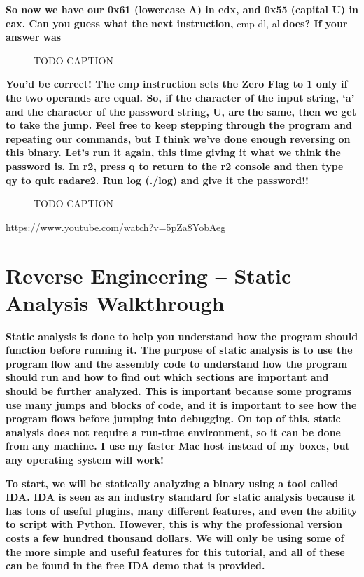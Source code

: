 \documentclass[letterpaper]{article}
\newcommand{\sitfig}[3]{
\begin{figure}[H]
\centering
\makebox[\textwidth][c]{
#2
}
\caption{#3}
\label{#1}
\end{figure}
}
\newcommand{\sitgfx}[4][scale=1.0]{
\sitfig{#3}{\texttt{[image: \#2]}}{#4}
}
\begin{document}
\textbf{So now we have our 0x61 (lowercase A) in edx, and 0x55 (capital U) in eax. Can you guess what the next
instruction, }cmp dl, al \textbf{does? If your answer was }  
\sitgfx[width=6.5in,height=1.8055in]{FINALWORKINGDOCFORMERLYPRECURSOR-img043.png}{fig:unk}{TODO CAPTION}
 

\textbf{You'd be correct! The cmp instruction sets the Zero Flag to 1 only if the two operands are equal. So, if the
character of the input string, `a' and the character of the password string, U, are the same, then we get to take the
jump. Feel free to keep stepping through the program and repeating our commands, but I think we've done enough
reversing on this binary. Let's run it again, this time giving it what we think the password is. In r2, press q to
return to the r2 console and then type qy to quit radare2. Run log (./log) and give it the password!! }
\sitgfx[width=6.4165in,height=1.3126in]{FINALWORKINGDOCFORMERLYPRECURSOR-img044.png}{fig:unk}{TODO CAPTION}
\url{https://www.youtube.com/watch?v=5pZa8YobAeg}

\section{Reverse Engineering -- Static Analysis Walkthrough}

\textbf{Static analysis is done to help you understand how the program should function before running it. The purpose of
static analysis is to use the program flow and the assembly code to understand how the program should run and how to
find out which sections are important and should be further analyzed. This is important because some programs use many
jumps and blocks of code, and it is important to see how the program flows before jumping into debugging. On top of
this, static analysis does not require a run-time environment, so it can be done from any machine. I use my faster Mac
host instead of my boxes, but any operating system will work!}

\textbf{To start, we will be statically analyzing a binary using a tool called IDA. IDA is seen as an industry standard
for static analysis because it has tons of useful plugins, many different features, and even the ability to script with
Python. However, this is why the professional version costs a few hundred thousand dollars. We will only be using some
of the more simple and useful features for this tutorial, and all of these can be found in the free IDA demo that is
provided.}
\end{document}
